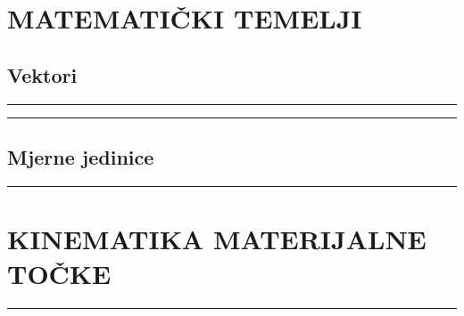 \documentclass[10pt]{book}
\newcounter{zadatak} %
\newcounter{cjelina}
\begin{document}


\tableofcontents
 
\clearpage


\chapter{MATEMATIČKI TEMELJI}



\section{Vektori}


%

\noindent
{\color{boja} \rule{\linewidth}{0.3mm} }

\vspace{0.8cm}




\noindent
{\color{boja} \rule{\linewidth}{0.3mm} }


\section{Mjerne jedinice}


\vspace{0.2cm}
\noindent
{\color{boja} \rule{\linewidth}{0.3mm} }


\vspace{0.8cm} 

\newpage
\chapter{KINEMATIKA MATERIJALNE TOČKE}
\setcounter{zadatak}{0}




\noindent
{\color{boja} \rule{\linewidth}{0.3mm} }

\vspace{0.8cm} 
\end{document}
